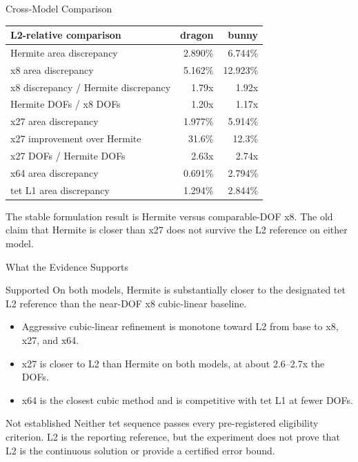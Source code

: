 \documentclass[aspectratio=169,10pt]{beamer}
\newcommand{\pct}[1]{#1\%}
\begin{document}
\begin{frame}{Cross-Model Comparison}
  \scriptsize
  \begin{table}
    \centering
    \begin{tabular}{lrr}
      \toprule
      L2-relative comparison & dragon & bunny \\
      \midrule
      Hermite area discrepancy & \pct{2.890} & \pct{6.744} \\
      x8 area discrepancy & \pct{5.162} & \pct{12.923} \\
      x8 discrepancy / Hermite discrepancy & 1.79x & 1.92x \\
      Hermite DOFs / x8 DOFs & 1.20x & 1.17x \\
      x27 area discrepancy & \pct{1.977} & \pct{5.914} \\
      x27 improvement over Hermite & 31.6\% & 12.3\% \\
      x27 DOFs / Hermite DOFs & 2.63x & 2.74x \\
      x64 area discrepancy & \pct{0.691} & \pct{2.794} \\
      tet L1 area discrepancy & \pct{1.294} & \pct{2.844} \\
      \bottomrule
    \end{tabular}
  \end{table}

  \vspace{0.6em}
  The stable formulation result is Hermite versus comparable-DOF x8. The old
  claim that Hermite is closer than x27 does not survive the L2 reference on
  either model.
\end{frame}

\begin{frame}{What the Evidence Supports}
  \small
  \begin{block}{Supported}
    On both models, Hermite is substantially closer to the designated tet L2
    reference than the near-DOF x8 cubic-linear baseline.
  \end{block}

  \begin{itemize}
    \item Aggressive cubic-linear refinement is monotone toward L2 from base to x8, x27, and x64.
    \item x27 is closer to L2 than Hermite on both models, at about 2.6--2.7x the DOFs.
    \item x64 is the closest cubic method and is competitive with tet L1 at fewer DOFs.
  \end{itemize}

  \begin{alertblock}{Not established}
    Neither tet sequence passes every pre-registered eligibility criterion.
    L2 is the reporting reference, but the experiment does not prove that L2
    is the continuous solution or provide a certified error bound.
  \end{alertblock}
\end{frame}
\end{document}

